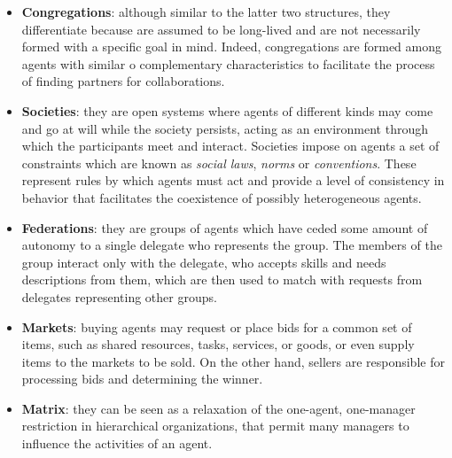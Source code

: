\begin{itemize}
    \item \textbf{Congregations}: although similar to the latter two structures, they differentiate because are assumed to be long-lived and are not necessarily formed with a specific goal in mind.
    Indeed, congregations are formed among agents with similar o complementary characteristics to facilitate the process of finding partners for collaborations.
    \item \textbf{Societies}: they are open systems where agents of different kinds may come and go at will while the society persists, acting as an environment through which the participants meet and interact.
    Societies impose on agents a set of constraints which are known as \textit{social laws}, \textit{norms} or \textit{conventions}.
    These represent rules by which agents must act and provide a level of consistency in behavior that facilitates the coexistence of possibly heterogeneous agents.
    \item \textbf{Federations}: they are groups of agents which have ceded some amount of autonomy to a single delegate who represents the group.
    The members of the group interact only with the delegate, who accepts skills and needs descriptions from them, which are then used to match with requests from delegates representing other groups.
    \item \textbf{Markets}: buying agents may request or place bids for a common set of items, such as shared resources, tasks, services, or goods, or even supply items to the markets to be sold.
    On the other hand, sellers are responsible for processing bids and determining the winner.
    \item \textbf{Matrix}: they can be seen as a relaxation of the one-agent, one-manager restriction in hierarchical organizations, that permit many managers to influence the activities of an agent.
\end{itemize}

